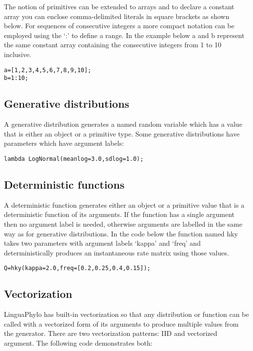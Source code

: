 \documentclass[10pt,letterpaper,table]{article}
\begin{document}
The notion of primitives can be extended to arrays and to declare a constant array you can enclose comma-delimited literals in square brackets as shown below. For sequences of consecutive integers a more compact notation can be employed using the `:' to define a range. In the example below a and b represent the same constant array containing the consecutive integers from 1 to 10 inclusive.

\begin{alltt}
  a = [1, 2, 3, 4, 5, 6, 7, 8, 9, 10];
  b = 1:10;
\end{alltt}

\subsection*{Generative distributions}

A generative distribution generates a named random variable which has a value that is either an object or a primitive type. Some generative distributions have parameters which have argument labels:

{\singlespacing
\begin{alltt}
  lambda ~ LogNormal(meanlog=3.0, sdlog=1.0);
\end{alltt}
}

\subsection*{Deterministic functions}

A deterministic function generates either an object or a primitive value that is a deterministic function of its arguments. If the function has a single argument then no argument label is needed, otherwise arguments are labelled in the same way as for generative distributions. In the code below the function named hky takes two parameters with argument labels `kappa' and `freq' and deterministically produces an instantaneous rate matrix using those values.

{\singlespacing
\begin{alltt}
  Q = hky(kappa=2.0, freq=[0.2, 0.25, 0.4, 0.15]);
\end{alltt}
}

\subsection*{Vectorization}

LinguaPhylo has built-in vectorization so that any distribution or function can be called with a vectorized form of its arguments to produce multiple values from the generator. There are two vectorization patterns: IID and vectorized argument. The following code demonstrates both:
\end{document}
